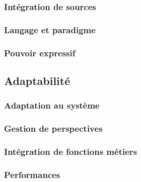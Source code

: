 \subsubsection{Intégration de sources}
\subsubsection{Langage et paradigme}
\subsubsection{Pouvoir expressif}

\subsection{Adaptabilité}
\subsubsection{Adaptation au système}
\subsubsection{Gestion de perspectives}
\subsubsection{Intégration de fonctions métiers}
\subsubsection{Performances}